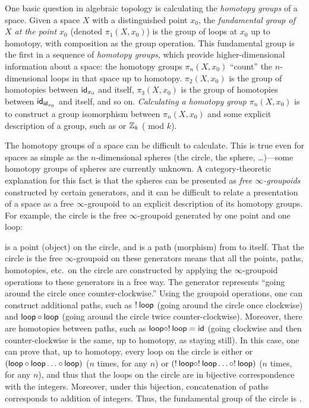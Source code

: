 One basic question in algebraic topology is calculating the
\emph{homotopy groups} of a space.  Given a space $X$ with a
distinguished point $x_0$, the \emph{fundamental group of $X$ at the
  point $x_0$} (denoted $\pi_1(X,x_0)$) is the group of loops at $x_0$
up to homotopy, with composition as the group operation.  This
fundamental group is the first in a sequence of \emph{homotopy groups},
which provide higher-dimensional information about a space: the homotopy
groups $\pi_n(X,x_0)$ ``count'' the $n$-dimensional loops in that space
up to homotopy.  $\pi_2(X,x_0)$ is the group of homotopies between
$\mathsf{id}_{{x_0}}$ and itself, $\pi_3(X,x_0)$ is the group of homotopies
between $\mathsf{id}_{\mathsf{id}_{{x_0}}}$ and itself, and so on.
\emph{Calculating a homotopy group $\pi_n(X,x_0)$} is to construct a
group isomorphism between $\pi_n(X,x_0)$ and some explicit description
of a group, such as \Z\/ or $\mathbb{Z}_k$ (\Z\/ mod $k$).

The homotopy groups of a space can be difficult to calculate.  This is
true even for spaces as simple as the $n$-dimensional spheres (the
circle, the sphere, \ldots)---some homotopy groups of spheres are
currently unknown.  A category-theoretic explanation for this fact is
that the spheres can be presented as \emph{free
  $\infty$-groupoids} constructed by certain generators, and it can be
difficult to relate a presentation of a space as a free
$\infty$-groupoid to an explicit description of its homotopy groups.
For example, the circle is the free $\infty$-groupoid generated by one point
and one loop:
%
\begin{center}
\end{center}
%
%
 is a point (object) on the circle, and  is a path
(morphism) from  to itself.  That the circle is the free
$\infty$-groupoid on these generators means that all the points, paths,
homotopies, etc.~on the circle are constructed by applying the
$\infty$-groupoid operations to these generators in a free way.  The generator
 represents ``going around the circle once
counter-clockwise.''  Using the groupoid operations, one can construct
additional paths, such as $! \: \mathsf{loop}$ (going around the circle once
clockwise) and $\mathsf{loop} \mathbin{\circ} \mathsf{loop}$ (going around the circle
twice counter-clockwise).  Moreover, there are homotopies between paths,
such as $\mathsf{loop} \mathbin{\circ} ! \: \mathsf{loop} = \mathsf{id}$ (going clockwise and
then counter-clockwise is the same, up to homotopy, as staying still).
In this case, one can prove that, up to homotopy,
every loop on the circle is either  or $(\mathsf{loop} \mathbin{\circ}
\mathsf{loop} \ldots \mathbin{\circ} \mathsf{loop})$ ($n$ times, for any $n$) or $(! \: 
\mathsf{loop} \mathbin{\circ} ! \:   \mathsf{loop} \ldots \mathbin{\circ} ! \:  \mathsf{loop})$ ($n$ times,
for any $n$), and thus that the loops on the circle are in bijective
correspondence with the integers.  Moreover, under this bijection, concatenation of paths corresponds to
addition of integers.  Thus, the fundamental group of the
circle is \Z.

